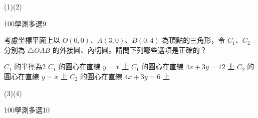 \begin{QUESTIONS}
\begin{QUESTION}
\begin{QFROMS}
        \end{QFROMS}
        \begin{QTAGS}\end{QTAGS}
        \begin{QANS}
            (1)(2)
        \end{QANS}
        \begin{QSOLLIST}
        \end{QSOLLIST}
        \begin{QEMPTYSPACE}
        \end{QEMPTYSPACE}
    \end{QUESTION}
    \begin{QUESTION}
        \begin{ExamInfo}{100}{學測}{多選}{9}
        \end{ExamInfo}
        \begin{ExamAnsRateInfo}{61}{90}{62}{31}
        \end{ExamAnsRateInfo}
        \begin{QBODY}
			考慮坐標平面上以 $O(0,0)$、$A(3,0)$、$B(0,4)$ 為頂點的三角形，令 $C_1$、$C_2$ 分別為 $\triangle OAB$ 的外接圓、內切圓。請問下列哪些選項是正確的？
			\begin{QOPS}
				\QOP $C_1$ 的半徑為2 
				\QOP $C_1$ 的圓心在直線 $y=x$ 上 
				\QOP $C_1$ 的圓心在直線 $4x+3y=12$ 上    
				\QOP $C_2$ 的圓心在直線 $y=x$ 上 \quad 
				\QOP $C_2$ 的圓心在直線 $4x+3y=6$ 上
			\end{QOPS}
        \end{QBODY}
        \begin{QFROMS}
        \end{QFROMS}
        \begin{QTAGS}\end{QTAGS}
        \begin{QANS}
            (3)(4)
        \end{QANS}
        \begin{QSOLLIST}
        \end{QSOLLIST}
        \begin{QEMPTYSPACE}
        \end{QEMPTYSPACE}
    \end{QUESTION}
    \begin{QUESTION}
        \begin{ExamInfo}{100}{學測}{多選}{10}
        \end{ExamInfo}
        \begin{ExamAnsRateInfo}{37}{64}{33}{14}

\end{ExamAnsRateInfo}
\end{QUESTION}
\end{QUESTIONS}
